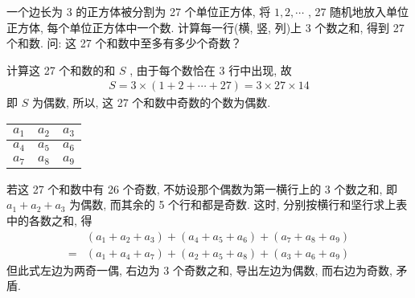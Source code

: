 \begin{example}
	一个边长为 3 的正方体被分割为 27 个单位正方体, 将 $1,2, \cdots$ ,  27 随机地放入单位正方体, 每个单位正方体中一个数. 计算每一行(横, 竖, 列)上 3 个数之和, 得到 27 个和数. 问: 这 27 个和数中至多有多少个奇数？
\end{example}
\begin{solution}
	计算这 27 个和数的和 $S$ , 由于每个数恰在 3 行中出现, 故
	\begin{align*}
		S=3 \times(1+2+\cdots+27)=3 \times 27 \times 14
	\end{align*}
	即 $S$ 为偶数, 所以, 这 27 个和数中奇数的个数为偶数.
	\begin{table}[ht]
		\centering
		\begin{tabular}{|l|l|l|}
			\hline
			$a_1$ & $a_2$ & $a_3$ \\ \hline
			$a_4$ & $a_5$ & $a_6$ \\ \hline
			$a_7$ & $a_8$ & $a_9$ \\ \hline
		\end{tabular}
	\end{table}
	若这 27 个和数中有 26 个奇数, 不妨设那个偶数为第一横行上的 3 个数之和, 即 $a_{1}+a_{2}+a_{3}$ 为偶数, 而其余的 5 个行和都是奇数. 这时, 分别按横行和坚行求上表中的各数之和, 得
	\begin{align}
		  & \left(a_{1}+a_{2}+a_{3}\right)+\left(a_{4}+a_{5}+a_{6}\right)+\left(a_{7}+a_{8}+a_{9}\right) \\
		= & \left(a_{1}+a_{4}+a_{7}\right)+\left(a_{2}+a_{5}+a_{8}\right)+\left(a_{3}+a_{6}+a_{9}\right)
	\end{align}
	但此式左边为两奇一偶, 右边为 3 个奇数之和, 导出左边为偶数, 而右边为奇数, 矛盾.


\end{solution}
